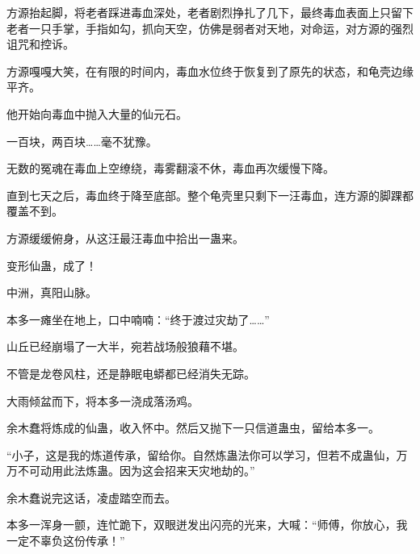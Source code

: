 \begin{this_body}
方源抬起脚，将老者踩进毒血深处，老者剧烈挣扎了几下，最终毒血表面上只留下老者一只手掌，手指如勾，抓向天空，仿佛是弱者对天地，对命运，对方源的强烈诅咒和控诉。

方源嘎嘎大笑，在有限的时间内，毒血水位终于恢复到了原先的状态，和龟壳边缘平齐。

他开始向毒血中抛入大量的仙元石。

一百块，两百块……毫不犹豫。

无数的冤魂在毒血上空缭绕，毒雾翻滚不休，毒血再次缓慢下降。

直到七天之后，毒血终于降至底部。整个龟壳里只剩下一汪毒血，连方源的脚踝都覆盖不到。

方源缓缓俯身，从这汪最汪毒血中拾出一蛊来。

变形仙蛊，成了！

中洲，真阳山脉。

本多一瘫坐在地上，口中喃喃：“终于渡过灾劫了……”

山丘已经崩塌了一大半，宛若战场般狼藉不堪。

不管是龙卷风柱，还是静眠电蟒都已经消失无踪。

大雨倾盆而下，将本多一浇成落汤鸡。

余木蠢将炼成的仙蛊，收入怀中。然后又抛下一只信道蛊虫，留给本多一。

“小子，这是我的炼道传承，留给你。自然炼蛊法你可以学习，但若不成蛊仙，万万不可动用此法炼蛊。因为这会招来天灾地劫的。”

余木蠢说完这话，凌虚踏空而去。

本多一浑身一颤，连忙跪下，双眼迸发出闪亮的光来，大喊：“师傅，你放心，我一定不辜负这份传承！”

\end{this_body}

